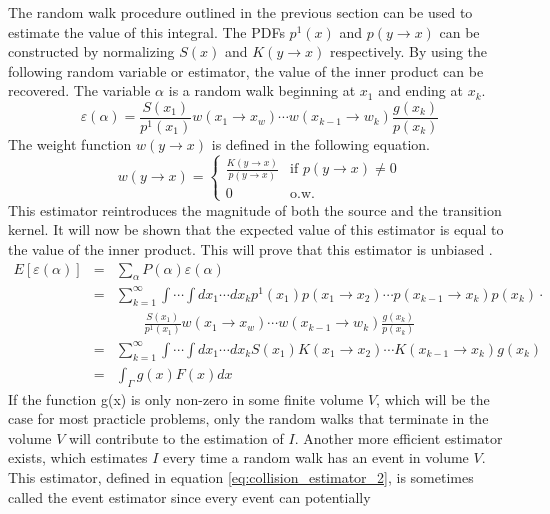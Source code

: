The random walk procedure outlined in the previous section can be used to
estimate the value of this integral. The PDFs $p^1(x)$ and $p(y \to x)$ can be 
constructed by normalizing $S(x)$ and $K(y \to x)$ respectively. By using the
following random variable or estimator, the value of the inner product can 
be recovered. The variable $\alpha$ is a random walk beginning at $x_1$ and 
ending at $x_k$.
\begin{equation}
  \varepsilon(\alpha) = \frac{S(x_1)}{p^1(x_1)}w(x_1 \to x_w)\cdots 
  w(x_{k-1} \to w_k)\frac{g(x_k)}{p(x_k)}
  \label{eq:collision_estimator_1}
\end{equation}
The weight function $w(y \to x)$ is defined in the following equation.
\begin{equation}
  w(y \to x) = 
  \begin{cases}
    \frac{K(y \to x)}{p(y \to x)} & \text{if } p(y \to x) \neq 0 \\
    0 & \text{o.w.}
  \end{cases}
\end{equation}
This estimator reintroduces the magnitude of both the source and the transition
kernel. It will now be shown that the expected value of this estimator is 
equal to the value of the inner product. This will prove that this estimator is
unbiased \citep{spanier_monte_1969}.
\begin{eqnarray}
  E\left[\varepsilon(\alpha)\right] & = & \sum_{\alpha} 
  P(\alpha)\varepsilon(\alpha) \nonumber \\
  & = & \sum_{k=1}^{\infty} \int \cdots \int dx_1 \cdots dx_k p^1(x_1)
  p(x_1 \to x_2) \cdots p(x_{k-1} \to x_k)p(x_k) \cdot \nonumber \\
  & & \qquad \frac{S(x_1)}{p^1(x_1)}w(x_1 \to x_w)\cdots 
  w(x_{k-1} \to w_k)\frac{g(x_k)}{p(x_k)} \nonumber \\
  & = & \sum_{k=1}^{\infty} \int \cdots \int dx_1 \cdots dx_k S(x_1)K(x_1 \to x_2)
  \cdots K(x_{k-1} \to x_k)g(x_k) \nonumber \\
  & = & \int_{\Gamma} g(x)F(x)dx \nonumber  
\end{eqnarray}
If the function g(x) is only non-zero in some finite volume $V$, which will be 
the case for most practicle problems, only the random walks that terminate in 
the volume $V$ will contribute to the estimation of $I$. Another more efficient
estimator exists, which estimates $I$ every time a random walk has an event in 
volume $V$. This estimator, defined in equation \ref{eq:collision_estimator_2},
is sometimes called the event estimator since every event can potentially
